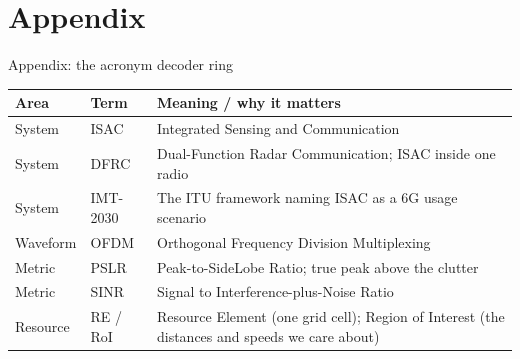
\section[Appendix]{Appendix}


\begin{frame}{Appendix: the acronym decoder ring}
  \vspace{-0.2em}
  \scriptsize
  \renewcommand{\arraystretch}{1.10}
  \begin{tabularx}{\textwidth}{l l >{\raggedright\arraybackslash}X}
    \toprule
    \textbf{Area} & \textbf{Term} & \textbf{Meaning / why it matters} \\
    \midrule
    System & ISAC & Integrated Sensing and Communication \\
    System & DFRC & Dual-Function Radar Communication; ISAC inside one radio \\
    System & IMT-2030 & The ITU framework naming ISAC as a 6G usage scenario \\
    Waveform & OFDM & Orthogonal Frequency Division Multiplexing \\
    Metric & PSLR & Peak-to-SideLobe Ratio; true peak above the clutter \\
    Metric & SINR & Signal to Interference-plus-Noise Ratio \\
    Resource & RE / RoI & Resource Element (one grid cell); Region of Interest (the distances and speeds we care about) \\
    \bottomrule
  \end{tabularx}
\end{frame}

